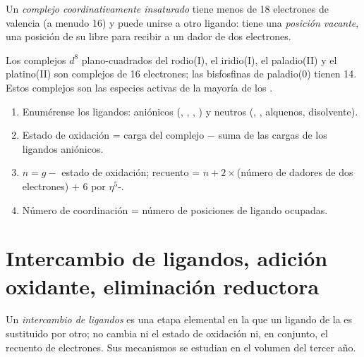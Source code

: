 \begin{definition}\label{def:b2:catalytic-cycles:unsaturated}
Un \emph{complejo coordinativamente insaturado}
tiene menos de 18 electrones de valencia (a menudo 16) y puede unirse a otro ligando: tiene una
\emph{posición vacante}, una posición de su  libre para
recibir a un dador de dos electrones.
\end{definition}

Los complejos $d^8$ plano-cuadrados del rodio(I), el iridio(I), el paladio(II) y el
platino(II) son complejos de 16 electrones; las bisfosfinas de paladio(0)  tienen 14.
Estos complejos son las especies activas de la mayoría de los .

\begin{method}\label{met:b2:catalytic-cycles:count-organometallic}
\begin{enumerate}
  \item Enumérense los ligandos: aniónicos (, , , ) y neutros
        (, , alquenos, disolvente).
  \item Estado de oxidación = carga del complejo $-$ suma de las cargas de los ligandos aniónicos.
  \item $n = g -$ estado de oxidación; recuento = $n + 2 \times$(número de dadores de dos electrones)
        $+$ 6 por $\eta^5$-.
  \item Número de coordinación = número de posiciones de ligando ocupadas.
\end{enumerate}
\end{method}

\section{Intercambio de ligandos, adición oxidante, eliminación reductora}

\begin{definition}\label{def:b2:catalytic-cycles:ligand-exchange}
Un \emph{intercambio de ligandos} es una etapa elemental en la que un ligando de
la  es sustituido por otro; no cambia ni el estado de oxidación
ni, en conjunto, el recuento de electrones. Sus mecanismos se estudian en el volumen del tercer año.
\end{definition}

